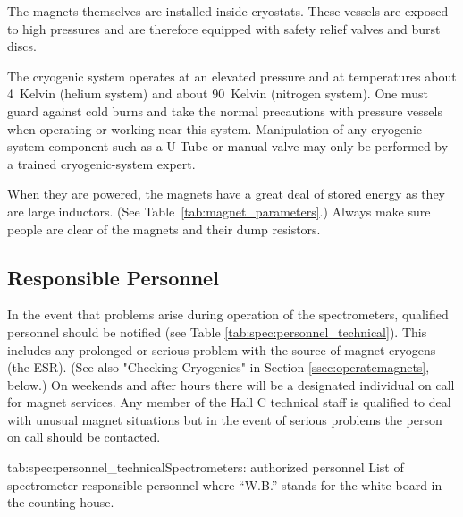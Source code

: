 \begin{safetyen}{0}{0}
The magnets themselves are installed inside cryostats.  These vessels 
are exposed to high pressures and are therefore equipped with safety 
relief valves and burst discs.   

The cryogenic system operates at an elevated pressure and at temperatures
about 4~Kelvin (helium system) and about 90~Kelvin (nitrogen system).  One must
guard against cold burns and take the normal precautions with pressure
vessels when operating or working near this system.  Manipulation of any cryogenic 
system component such as a U-Tube or manual valve may only be performed by
a trained cryogenic-system expert.

When they are powered, the magnets have a great deal of stored energy as they are large 
inductors. (See Table~\ref{tab:magnet_parameters}.) Always make sure people are clear of 
the magnets and their dump resistors.

\subsection{Responsible Personnel}

In the event that problems arise during 
operation of the spectrometers, qualified personnel should be notified
(see Table \ref{tab:spec:personnel_technical}).  
This includes any prolonged or serious problem with the source of magnet 
cryogens (the ESR).  (See also "Checking Cryogenics" in Section \ref{ssec:operatemagnets}, below.)
On weekends and after hours there will be a 
designated individual on call for magnet services.  Any member of the 
Hall C technical staff is qualified to deal with unusual magnet 
situations but in the event of serious problems the person on
call should be contacted.

\begin{namestab}{tab:spec:personnel_technical}{Spectrometers: authorized personnel}{%
      List of spectrometer responsible personnel where ``W.B.'' stands for the white board 
      in the counting house.}
   \PaulBrindza{}
   \SteveLassiter{}
   \EricSun{}
   \MikeFowler{}
   \JoeBeaufait{}
   \JackSegal{}
   \MahlonLong{}
\end{namestab}


\end{safetyen}

